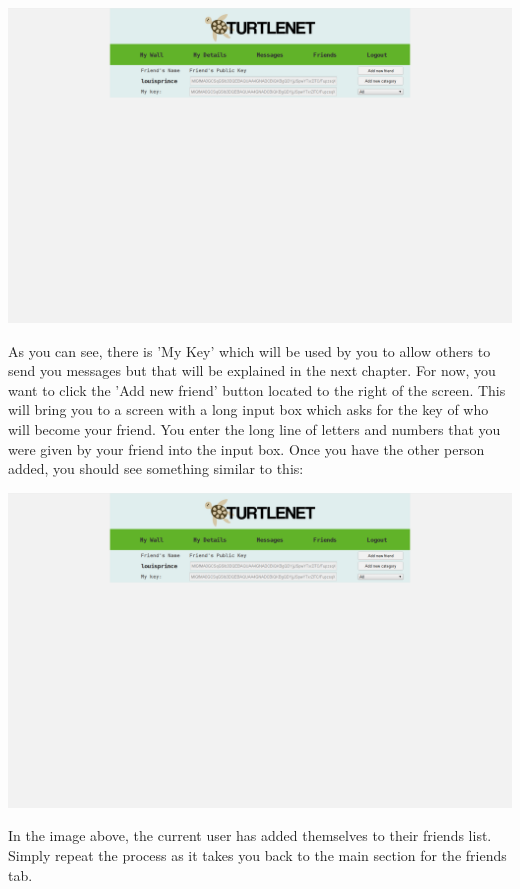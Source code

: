 \includegraphics[scale=0.2]{../Screenshots/Screenshot from 2014-04-29 22-31-10}

As you can see, there is 'My Key' which will be used by you to allow others to
send you messages but that will be explained in the next chapter.  For now, you
want to click the 'Add new friend' button located to the right of the screen.
This will bring you to a screen with a long input box which asks for the key of
who will become your friend.  You enter the long line of letters and numbers
that you were given by your friend into the input box.  Once you have the other
person added, you should see something similar to this:

\includegraphics[scale=0.2]{../Screenshots/Screenshot from 2014-04-29 22-31-10}

In the image above, the current user has added themselves to their friends list.
Simply repeat the process as it takes you back to the main section for the
friends tab.

